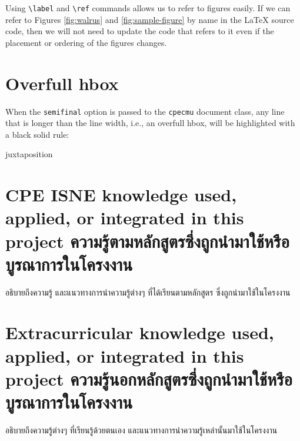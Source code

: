 Using \verb.\label. and \verb.\ref. commands allows us to refer to
figures easily. If we can refer to Figures
\ref{fig:walrus} and \ref{fig:sample-figure} by name in the {\LaTeX}
source code, then we will not need to update the code that refers to it
even if the placement or ordering of the figures changes.

\loremipsum\loremipsum


\loremipsum\loremipsum\loremipsum

\section{Overfull hbox}

When the \verb.semifinal. option is passed to the \verb.cpecmu. document class,
any line that is longer than the line width, i.e., an overfull hbox, will be
highlighted with a black solid rule:
\begin{center}
\begin{minipage}{2em}
juxtaposition
\end{minipage}
\end{center}

\section{\ifenglish%
\ifcpe CPE \else ISNE \fi knowledge used, applied, or integrated in this project
\else%
ความรู้ตามหลักสูตรซึ่งถูกนำมาใช้หรือบูรณาการในโครงงาน
\fi
}

อธิบายถึงความรู้ และแนวทางการนำความรู้ต่างๆ ที่ได้เรียนตามหลักสูตร ซึ่งถูกนำมาใช้ในโครงงาน

\section{\ifenglish%
Extracurricular knowledge used, applied, or integrated in this project
\else%
ความรู้นอกหลักสูตรซึ่งถูกนำมาใช้หรือบูรณาการในโครงงาน
\fi
}

อธิบายถึงความรู้ต่างๆ ที่เรียนรู้ด้วยตนเอง และแนวทางการนำความรู้เหล่านั้นมาใช้ในโครงงาน
